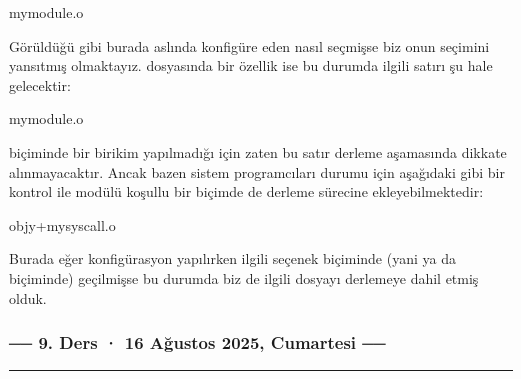 \documentclass[a4paper,10pt,turkish]{sphinxmanual}
\begin{document}
\begin{sphinxVerbatim}[commandchars=\\\{\}]
mymodule.o
\end{sphinxVerbatim}

\sphinxAtStartPar
Görüldüğü gibi burada aslında konfigüre eden nasıl seçmişse biz onun seçimini yansıtmış olmaktayız.
 dosyasında bir özellik  ise bu durumda ilgili  satırı şu hale gelecektir:

\begin{sphinxVerbatim}[commandchars=\\\{\}]
mymodule.o
\end{sphinxVerbatim}

\sphinxAtStartPar
{} biçiminde bir birikim yapılmadığı için zaten bu satır derleme aşamasında dikkate alınmayacaktır.
Ancak bazen sistem programcıları  durumu için aşağıdaki gibi bir kontrol ile modülü koşullu bir
biçimde de derleme sürecine ekleyebilmektedir:

\begin{sphinxVerbatim}[commandchars=\\\{\}]
obj\PYGZhy{}y+mysyscall.o
\end{sphinxVerbatim}

\sphinxAtStartPar
Burada eğer konfigürasyon yapılırken ilgili seçenek  biçiminde (yani \sphinxcode{\sphinxupquote{{[}*{]}}} ya da \sphinxcode{\sphinxupquote{\textless{}*\textgreater{}}}
biçiminde) geçilmişse bu durumda biz de ilgili dosyayı derlemeye dahil etmiş olduk.
\subsubsection*{── 9. Ders · 16 Ağustos 2025, Cumartesi ──}


\bigskip\hrule\bigskip
\end{document}
